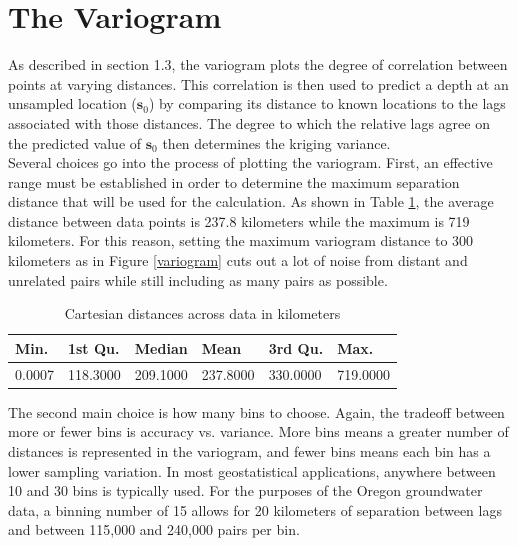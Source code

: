 \documentclass[12pt,twoside]{reedthesis}
\begin{document}
\section{The Variogram}


As described in section 1.3, the variogram plots the degree of correlation between points at varying distances. This correlation is then used to predict a depth at an unsampled location ($\mathbf{s}_0$) by comparing its distance to known locations to the lags associated with those distances. The degree to which the relative lags agree on the predicted value of $\mathbf{s}_0$ then determines the kriging variance. \\

Several choices go into the process of plotting the variogram. First, an effective range must be established in order to determine the maximum separation distance that will be used for the calculation. As shown in Table \ref{dists}, the average distance between data points is 237.8 kilometers while the maximum is 719 kilometers. For this reason, setting the maximum variogram distance to 300 kilometers as in Figure \ref{variogram} cuts out a lot of noise from distant and unrelated pairs while still including as many pairs as possible. 

\begin{table}[h]

\centering

\begin{tabular}{l|l|l|l|l|l}

\hline
Min.  & 1st Qu.  & Median  &   Mean  & 3rd Qu.  &   Max. \\
\hline
  0.0007 & 118.3000 & 209.1000 & 237.8000 & 330.0000 & 719.0000 \\
\hline

\end{tabular}

\caption{Cartesian distances across data in kilometers}
\label{dists}

\end{table}
The second main choice is how many bins to choose. Again, the tradeoff between more or fewer bins is accuracy vs. variance. More bins means a greater number of distances is represented in the variogram, and fewer bins means each bin has a lower sampling variation. In most geostatistical applications, anywhere between 10 and 30 bins is typically used. For the purposes of the Oregon groundwater data, a binning number of 15 allows for 20 kilometers of separation between lags and between 115,000 and 240,000 pairs per bin. \\
\end{document}
